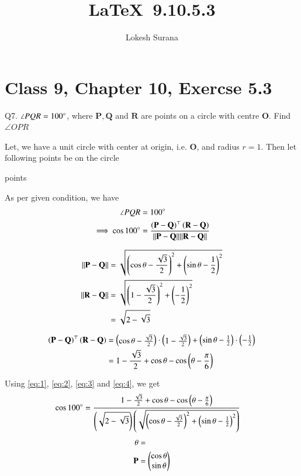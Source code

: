 \documentclass[journal,12pt,twocolumn]{IEEEtran}
\let\vec\mathbf
\begin{document}
\vspace{3cm}
\title{\LaTeX\ 9.10.5.3}
\author{Lokesh Surana}
\maketitle
\section*{Class 9, Chapter 10, Exercse 5.3}

Q7. $\angle{PQR} = 100\degree$, where $\vec{P}, \vec{Q}$ and $\vec{R}$ are points on a circle with centre $\vec{O}$. Find $\angle{OPR}$

\solution 
Let, we have a unit circle with center at origin, i.e. $\vec{O}$, and radius $r = 1$.
Then let following points be on the circle

\begin{table}[ht!]
    
    \caption{points}
    \label{tab:points}
\end{table}

As per given condition, we have
\begin{align}
    \angle{PQR} &= 100\degree \\
    \label{eq:1} \implies \cos100\degree &=  \frac{\brak{\vec{P} - \vec{Q}}^\top \brak{\vec{R} - \vec{Q}}}{\norm{\vec{P} - \vec{Q}} \norm{\vec{R} - \vec{Q}}}
\end{align}

\begin{align}
    \label{eq:2} \norm{\vec{P} - \vec{Q}} &= \sqrt{\brak{\cos\theta - \frac{\sqrt{3}}{2}}^2 + \brak{\sin\theta - \frac{1}{2}}^2} \\
    \norm{\vec{R} - \vec{Q}} &= \sqrt{\brak{1-\frac{\sqrt{3}}{2}}^2 + \brak{-\frac{1}{2}}^2} \\
    \label{eq:3} &= \sqrt{2 - \sqrt{3}}
\end{align}

\begin{align}
     \brak{\vec{P} - \vec{Q}}^\top \brak{\vec{R} - \vec{Q}} &= 
    \myvec{\cos\theta - \frac{\sqrt{3}}{2}} \cdot \myvec{1 - \frac{\sqrt{3}}{2}} + \myvec{\sin\theta - \frac{1}{2}} \cdot \myvec{-\frac{1}{2}} \\
    \label{eq:4} &= 1 - \frac{\sqrt{3}}{2} + \cos\theta - \cos\brak{\theta - \frac{\pi}{6}} 
\end{align}
    
Using \eqref{eq:1}, \eqref{eq:2}, \eqref{eq:3} and \eqref{eq:4}, we get
\begin{align}
	\cos100\degree &= \frac{1 - \frac{\sqrt{3}}{2} + \cos\theta - \cos\left(\theta - \frac{\pi}{6}\right) }{\left(\sqrt{2 - \sqrt{3}}\right)\left(\sqrt{\left(\cos\theta - \frac{\sqrt{3}}{2}\right)^2 + \left(\sin\theta - \frac{1}{2}\right)^2}\right)}
\end{align}
\begin{align}
    \theta &= \\
    \vec{P} &= \myvec{\cos\theta \\ \sin\theta}   
\end{align}
\end{document}
